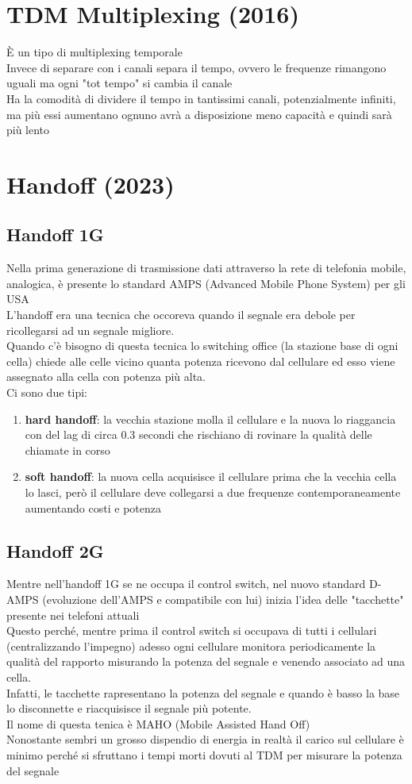 \documentclass[12pt,oneside,a4paper]{article}
\begin{document}
\section{TDM Multiplexing (2016)}
È un tipo di multiplexing temporale\\
Invece di separare con i canali separa il tempo, ovvero le frequenze rimangono uguali ma ogni "tot tempo" si cambia il canale\\
Ha la comodità di dividere il tempo in tantissimi canali, potenzialmente infiniti, ma più essi aumentano ognuno avrà a disposizione meno capacità e quindi sarà più lento
\section{Handoff (2023)}
\subsection{Handoff 1G}
Nella prima generazione di trasmissione dati attraverso la rete di telefonia mobile, analogica, è presente lo standard AMPS (Advanced Mobile Phone System) per gli USA\\
L'handoff era una tecnica che occoreva quando il segnale era debole per ricollegarsi ad un segnale migliore.\\
Quando c'è bisogno di questa tecnica lo switching office (la stazione base di ogni cella) chiede alle celle vicino quanta potenza ricevono dal cellulare ed esso viene assegnato alla cella con potenza più alta.\\
Ci sono due tipi:
\begin{enumerate}
\item \textbf{hard handoff}: la vecchia stazione molla il cellulare e la nuova lo riaggancia con del lag di circa 0.3 secondi che rischiano di rovinare la qualità delle chiamate in corso 
\item \textbf{soft handoff}: la nuova cella acquisisce il cellulare prima che la vecchia cella lo lasci, però il cellulare deve collegarsi a due frequenze contemporaneamente aumentando costi e potenza
\end{enumerate}
\subsection{Handoff 2G}
Mentre nell'handoff 1G se ne occupa il control switch, nel nuovo standard D-AMPS (evoluzione dell'AMPS e compatibile con lui) inizia l'idea delle "tacchette" presente nei telefoni attuali\\
Questo perché, mentre prima il control switch si occupava di tutti i cellulari (centralizzando l'impegno) adesso ogni cellulare monitora periodicamente la qualità del rapporto misurando la potenza del segnale e venendo associato ad una cella.\\
Infatti, le tacchette rapresentano la potenza del segnale e quando è basso la base lo disconnette e riacquisisce il segnale più potente.\\
Il nome di questa tenica è MAHO (Mobile Assisted Hand Off)\\
Nonostante sembri un grosso dispendio di energia in realtà il carico sul cellulare è minimo perché si sfruttano i tempi morti dovuti al TDM per misurare la potenza del segnale
\end{document}
